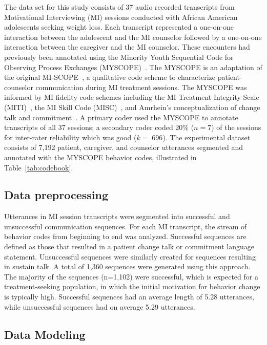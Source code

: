 The data set for this study consists of 37 audio recorded transcripts from Motivational Interviewing (MI) sessions conducted with African American adolescents seeking weight loss. Each transcript represented a one-on-one interaction between the adolescent and the MI counselor followed by a one-on-one interaction between the caregiver and the MI counselor. These encounters had previously been annotated using the Minority Youth Sequential Code for Observing Process Exchanges (MYSCOPE)~\cite{carcone2013provider}. The MYSCOPE is an adaptation of the original MI-SCOPE~\cite{martin2005motivational}, a qualitative code scheme to characterize patient-counselor communication during MI treatment sessions. The MYSCOPE was informed by MI fidelity code schemes including the MI Treatment Integrity Scale (MITI)~\cite{moyers2005assessing}, the MI Skill Code (MISC)~\cite{apodaca2007motivational}, and Amrhein’s conceptualization of change talk and commitment~\cite{amrhein2004does}. A primary coder used the MYSCOPE to annotate transcripts of all 37 sessions; a secondary coder coded 20\% ($n = 7$) of the sessions for inter-rater reliability which was good ($k = .696$). The experimental dataset consists of 7,192 patient, caregiver, and counselor utterances segmented and annotated with the MYSCOPE behavior codes, illustrated in Table~\ref{tab:codebook}.

\subsection{Data preprocessing}
\label{subsec:datapreprocessing}
Utterances in MI session transcripts were segmented into successful and unsuccessful communication sequences. For each MI transcript, the stream of behavior codes from beginning to end was analyzed. Successful sequences are defined as those that resulted in a patient change talk or commitment language statement. Unsuccessful sequences were similarly created for sequences resulting in sustain talk. A total of 1,360 sequences were generated using this approach. The majority of the sequences (n=1,102) were successful, which is expected for a treatment-seeking population, in which the initial motivation for behavior change is typically high. Successful sequences had an average length of 5.28 utterances, while unsuccessful sequences had on average 5.29 utterances.  

\subsection{Data Modeling}
\label{subsec:dataModeling}
